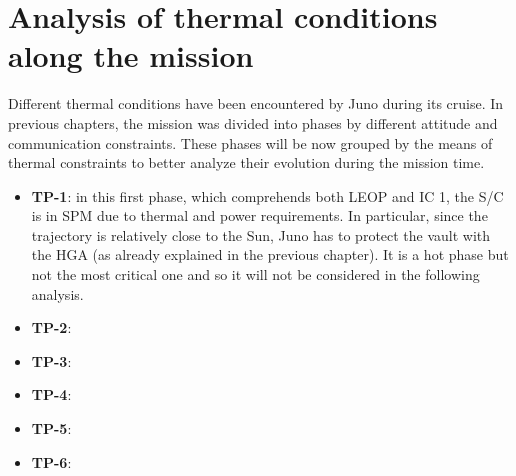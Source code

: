 \section{Analysis of thermal conditions along the mission}
\label{sec:TCS_phases}

Different thermal conditions have been encountered by Juno during its cruise. In previous chapters, the mission was divided into phases by different attitude and communication constraints. These phases will be now grouped by the means of thermal constraints to better analyze their evolution during the mission time.

\begin{itemize}
    \item \textbf{TP-1}:
    in this first phase, which comprehends both LEOP and IC 1, the S/C is in SPM due to thermal and power requirements. In particular, since the trajectory is relatively close to the Sun, Juno has to protect the vault with the HGA (as already explained in the previous chapter).
    It is a hot phase but not the most critical one and so it will not be considered in the following analysis.

    \item \textbf{TP-2}:
    
    
    \item \textbf{TP-3}:
    
    
    \item \textbf{TP-4}:
    
    
    \item \textbf{TP-5}:
    
    
    \item \textbf{TP-6}:
    
    
\end{itemize}